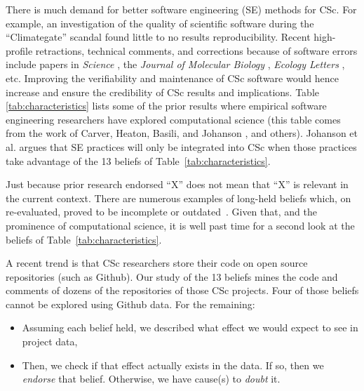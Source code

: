 \documentclass[conference,10pt]{IEEEtran}
\newcommand{\bi}{\begin{itemize}}
\newcommand{\ei}{\end{itemize}}
\begin{document}
There is much demand for better software engineering (SE) methods
for CSc. For example, an investigation of the 
quality of scientific software during the ``Climategate'' scandal \cite{merali10_error} found little to no results reproducibility. Recent high-profile retractions, technical comments, and corrections
because of software errors include papers in  \textit{Science} \cite{Chang1875_science, comments_science}, the \textit{Journal of Molecular Biology} \cite{Geoffrey_JMB}, \textit{Ecology Letters} \cite{lee_ecolet, david_ecolet}, etc. Improving the verifiability and maintenance of CSc software would hence increase and ensure the credibility of CSc results and implications. Table \ref{tab:characteristics}
lists some of the prior results
where empirical software
engineering researchers have explored computational science
(this table comes from the work of
Carver, Heaton, Basili, and Johanson \cite{carver13_perception, carver07_environment, basili08_hpc, heaton15_lit, johan18_secs}, and others).
Johanson et al. \cite{johan18_secs}   argues that SE practices will only be integrated into CSc when
those practices take advantage of
the   13 beliefs  of
Table~\ref{tab:characteristics}. 
 



Just  because  prior research endorsed
 ``X'' does not mean that  ``X'' is relevant in the current context. There are numerous examples of long-held beliefs which, on re-evaluated, proved to be incomplete or outdated~\cite{menzies17,dev16}. 
Given that, and the prominence  of 
computational science, it is 
well past time for a second look at the beliefs of 
Table~\ref{tab:characteristics}. 

A recent trend is that CSc researchers store their code on open source repositories (such as Github).
Our study of the 13 beliefs mines the code and comments of dozens of the repositories of  those CSc projects. Four of those beliefs cannot be explored using Github data. For the remaining:
\bi
\item Assuming each belief held,
we described what effect   we would expect to see in project data,
\item Then, we check if that effect actually exists in the data.
If so, then  we  {\em endorse} that belief. Otherwise, we have cause(s) to {\em doubt} it. 
\ei
\end{document}
